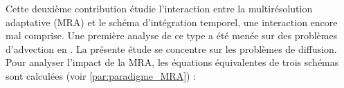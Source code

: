 Cette deuxième contribution étudie l'interaction entre la multirésolution adaptative (MRA) et le schéma d'intégration temporel, 
une interaction encore mal comprise. 
Une première analyse de ce type a été menée sur des problèmes d'advection en \cite{belloti_et_al_2025}. 
La présente étude se concentre sur les problèmes de diffusion. 
Pour analyser l'impact de la MRA, les équations équivalentes de trois schémas sont calculées (voir \ref{par:paradigme_MRA}) :

